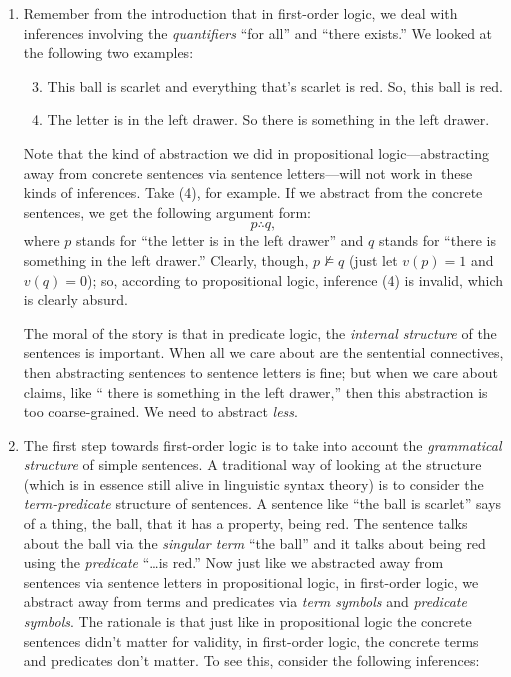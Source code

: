 	\begin{enumerate}[\thesection.1]

		\item Remember from the introduction that in first-order logic, we deal with inferences involving the \emph{quantifiers} ``for all'' and ``there exists.'' We looked at the following two examples:
		\begin{enumerate}[(1)]
		\setcounter{enumii}{2}
	
		\item This ball is scarlet and everything that's scarlet is red. So, this ball is red.
		
		\item The letter is in the left drawer. So there is something in the left drawer.
	
	\end{enumerate}
		Note that the kind of abstraction we did in propositional logic---abstracting away from concrete sentences via sentence letters---will not work in these kinds of inferences. Take (4), for example. If we abstract from the concrete sentences, we get the following argument form: 
		\[p\therefore q,\]
		where $p$ stands for ``the letter is in the left drawer'' and $q$ stands for ``there is something in the left drawer.'' Clearly, though, $p\nvDash q$ (just let $v(p)=1$ and $v(q)=0$); so, according to propositional logic, inference (4) is invalid, which is clearly absurd.
		
		The moral of the story is that in predicate logic, the \emph{internal structure} of the sentences is important. When all we care about are the sentential connectives, then abstracting sentences to sentence letters is fine; but when we care about claims, like `` there is something in the left drawer,'' then this abstraction is too coarse-grained. We need to abstract \emph{less}.
		
		\item The first step towards first-order logic is to take into account the \emph{grammatical structure} of simple sentences. A traditional way of looking at the structure (which is in essence still alive in linguistic syntax theory) is to consider the \emph{term-predicate} structure of sentences. A sentence like ``the ball is scarlet'' says of a thing, the ball, that it has a property, being red. The sentence talks about the ball via the \emph{singular term} ``the ball'' and it talks about being red using the \emph{predicate} ``\dots is red.'' Now just like we abstracted away from sentences via sentence letters  in propositional logic, in first-order logic, we abstract away from terms and predicates via \emph{term symbols} and \emph{predicate symbols}. The rationale is that just like in propositional logic the concrete sentences didn't matter for validity, in first-order logic, the concrete terms and predicates don't matter. To see this, consider the following inferences:
		\begin{enumerate}[(1')]
		\setcounter{enumii}{2}
	

\end{enumerate}
\end{enumerate}
